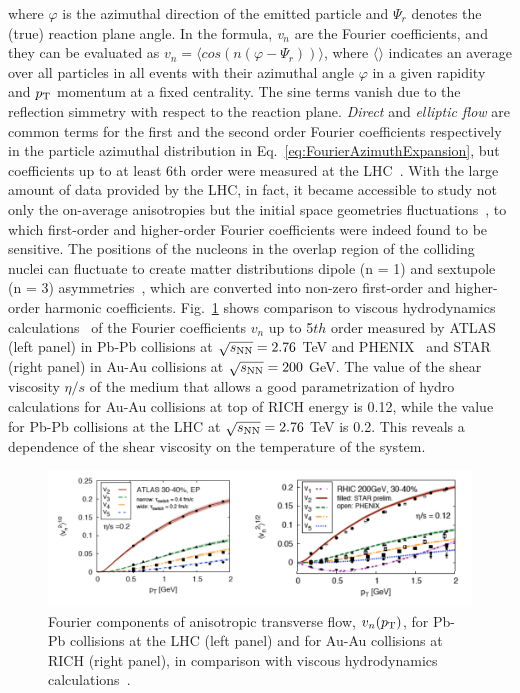 where $\varphi$ is the azimuthal direction of the emitted particle and 
$\Psi_r$ denotes the (true) reaction plane angle.
In the formula, {\it v$_n$} are the Fourier coefficients, and they can be 
evaluated as $v_n = \langle cos(n(\varphi - \Psi_r)) \rangle$, where 
$\langle \rangle$ indicates an average over all particles in all events with
 their azimuthal angle $\varphi$ in a given rapidity and $p_{\rm T}$ momentum at
  a fixed centrality. The sine terms vanish due to the reflection simmetry 
  with respect to the reaction plane. {\it Direct} and {\it elliptic flow} 
  are common terms for the first and the
second order Fourier coefficients respectively in the particle azimuthal 
distribution in Eq.~\ref{eq:FourierAzimuthExpansion}, but coefficients 
up to at least 6th order were measured at the LHC~\cite{ATLAS:2012at}.
With the large amount of data provided by the LHC, in fact, it became accessible
to study not only the on-average anisotropies but the initial space geometries 
fluctuations~\cite{Aad:2013xma,Schukraft:2012ah}, to which first-order and higher-order Fourier 
coefficients were indeed found to be sensitive. 
The positions of the nucleons in the overlap region of the colliding nuclei 
can fluctuate to create matter distributions dipole (n = 1) and
sextupole (n = 3) asymmetries~\cite{Teaney:2010vd,Alver:2010dn,Alver:2010gr}, which are converted into 
non-zero first-order and higher-order harmonic coefficients. 
Fig.~\ref{fig:vnHydro} shows
   comparison to viscous hydrodynamics calculations~\cite{Gale:2012rq} of the 
   Fourier coefficients $v_n$ up to 5$th$ order measured by ATLAS~\cite{ATLAS:2012at}
    (left panel) in Pb-Pb collisions at $\sqrt{s_{\rm NN}} = 2.76$ TeV and 
    PHENIX~\cite{Adare:2011tg} and STAR~\cite{Pandit:2012mq} 
    (right panel) in Au-Au collisions at $\sqrt{s_{\rm NN}} = 200 $ GeV. The value
     of the shear viscosity $\eta/s$ of the medium that allows a good parametrization 
     of hydro calculations for Au-Au collisions at top of RICH energy is 0.12, while the value
      for Pb-Pb collisions at the LHC at $\sqrt{s_{\rm NN}} = 2.76$ TeV is 0.2. 
      This reveals a dependence of the shear viscosity on the temperature of the system.
\begin{figure}[!ht]
  \centering
  \includegraphics[width=15cm]{FigCap1/RICH_ATLAS_vn.png}
  \caption{Fourier components of anisotropic transverse flow, $v_n(p_{\rm T})$, for Pb-Pb collisions at the LHC (left panel) and for Au-Au collisions at RICH (right panel), in comparison with viscous hydrodynamics calculations~\cite{Gale:2012rq}.}
  \label{fig:vnHydro}
\end{figure}
